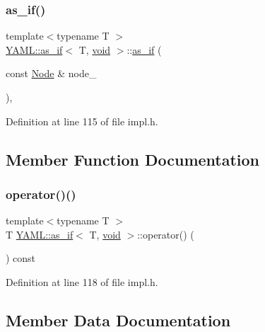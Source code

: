 \subsubsection{\texorpdfstring{as\_if()}{as\_if()}}
{\footnotesize\ttfamily template$<$typename T $>$ \\
\mbox{\hyperlink{struct_y_a_m_l_1_1as__if}{Y\+A\+M\+L\+::as\+\_\+if}}$<$ T, \mbox{\hyperlink{glad_8h_a950fc91edb4504f62f1c577bf4727c29}{void}} $>$\+::\mbox{\hyperlink{struct_y_a_m_l_1_1as__if}{as\+\_\+if}} (\begin{DoxyParamCaption}\item[{const \mbox{\hyperlink{class_y_a_m_l_1_1_node}{Node}} \&}]{node\+\_\+ }\end{DoxyParamCaption})\hspace{0.3cm}{\ttfamily [inline]}, {\ttfamily [explicit]}}



Definition at line 115 of file impl.\+h.



\subsection{Member Function Documentation}
\mbox{\label{struct_y_a_m_l_1_1as__if_3_01_t_00_01void_01_4_ac86e98cb633d17ca863b9b34bbd7ffed}} 
\subsubsection{\texorpdfstring{operator()()}{operator()()}}
{\footnotesize\ttfamily template$<$typename T $>$ \\
T \mbox{\hyperlink{struct_y_a_m_l_1_1as__if}{Y\+A\+M\+L\+::as\+\_\+if}}$<$ T, \mbox{\hyperlink{glad_8h_a950fc91edb4504f62f1c577bf4727c29}{void}} $>$\+::operator() (\begin{DoxyParamCaption}{ }\end{DoxyParamCaption}) const\hspace{0.3cm}{\ttfamily [inline]}}



Definition at line 118 of file impl.\+h.



\subsection{Member Data Documentation}
\mbox{\label{struct_y_a_m_l_1_1as__if_3_01_t_00_01void_01_4_a35de536b5f69760f1bb272295b9dd617}} 
